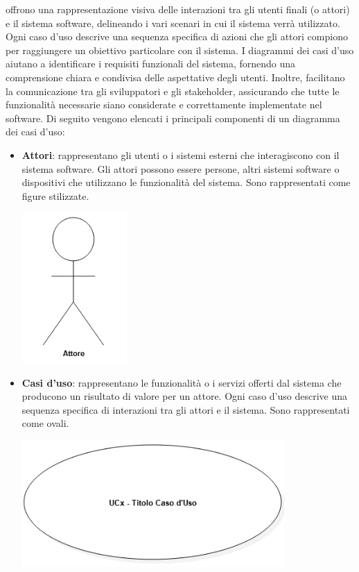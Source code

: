 offrono una rappresentazione visiva delle interazioni tra gli utenti finali (o attori) e il sistema software, delineando i vari scenari in cui il sistema verrà utilizzato. Ogni caso d'uso descrive una sequenza specifica di azioni che gli attori compiono per raggiungere un obiettivo particolare con il sistema. I diagrammi dei casi d'uso aiutano a identificare i requisiti funzionali del sistema, fornendo una comprensione chiara e condivisa delle aspettative degli utenti. Inoltre, facilitano la comunicazione tra gli sviluppatori e gli stakeholder, assicurando che tutte le funzionalità necessarie siano considerate e correttamente implementate nel software.
Di seguito vengono elencati i principali componenti di un diagramma dei casi d'uso:
\begin{itemize}
	\item \textbf{Attori}: rappresentano gli utenti o i sistemi esterni che interagiscono con il sistema software. Gli attori possono essere persone, altri sistemi software o dispositivi che utilizzano le funzionalità del sistema. Sono rappresentati come figure stilizzate. 
		\begin{center}
			\includegraphics*[width=4cm]{../../../images/norme_di_progetto/attore.png}
		\end{center} 
	\newpage
	\item \textbf{Casi d'uso}: rappresentano le funzionalità o i servizi offerti dal sistema che producono un risultato di valore per un attore. Ogni caso d'uso descrive una sequenza specifica di interazioni tra gli attori e il sistema. Sono rappresentati come ovali.
		\begin{center}
			\includegraphics*[width=10cm]{../../../images/norme_di_progetto/casoDiUso.png}

\end{center}
\end{itemize}
